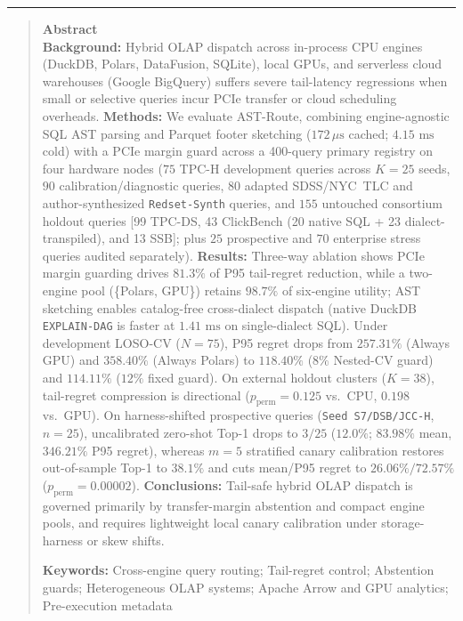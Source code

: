 \documentclass[10pt,a4paper]{article}
\begin{document}
\noindent\rule{\textwidth}{0.8pt}
\begin{quote}
\small\sffamily
\textbf{\color{springerblue}Abstract}\\[0.3em]
\textbf{Background:} Hybrid OLAP dispatch across in-process CPU engines (DuckDB, Polars, DataFusion, SQLite), local GPUs, and serverless cloud warehouses (Google BigQuery) suffers severe tail-latency regressions when small or selective queries incur PCIe transfer or cloud scheduling overheads.
\textbf{Methods:} We evaluate AST-Route, combining engine-agnostic SQL AST parsing and Parquet footer sketching ($172\,\mu\text{s}$ cached; $4.15\text{ ms}$ cold) with a PCIe margin guard across a 400-query primary registry on four hardware nodes ($75$ TPC-H development queries across $K=25$ seeds, $90$ calibration/diagnostic queries, $80$ adapted SDSS/NYC~TLC and author-synthesized \texttt{Redset-Synth} queries, and $155$ untouched consortium holdout queries [99 TPC-DS, 43 ClickBench (20 native SQL + 23 dialect-transpiled), and 13 SSB]; plus $25$ prospective and $70$ enterprise stress queries audited separately).
\textbf{Results:} Three-way ablation shows PCIe margin guarding drives $81.3\%$ of P95 tail-regret reduction, while a two-engine pool (\{Polars, GPU\}) retains $98.7\%$ of six-engine utility; AST sketching enables catalog-free cross-dialect dispatch (native DuckDB \texttt{EXPLAIN-DAG} is faster at $1.41\text{ ms}$ on single-dialect SQL). Under development LOSO-CV ($N=75$), P95 regret drops from $257.31\%$ (Always GPU) and $358.40\%$ (Always Polars) to $118.40\%$ ($8\%$ Nested-CV guard) and $114.11\%$ ($12\%$ fixed guard). On external holdout clusters ($K=38$), tail-regret compression is directional ($p_{\text{perm}}=0.125$ vs.\ CPU, $0.198$ vs.\ GPU). On harness-shifted prospective queries (\texttt{Seed S7/DSB/JCC-H}, $n=25$), uncalibrated zero-shot Top-1 drops to $3/25$ ($12.0\%$; $83.98\%$ mean, $346.21\%$ P95 regret), whereas $m=5$ stratified canary calibration restores out-of-sample Top-1 to $38.1\%$ and cuts mean/P95 regret to $26.06\%/72.57\%$ ($p_{\text{perm}}=0.00002$).
\textbf{Conclusions:} Tail-safe hybrid OLAP dispatch is governed primarily by transfer-margin abstention and compact engine pools, and requires lightweight local canary calibration under storage-harness or skew shifts.

\noindent\textbf{Keywords:} Cross-engine query routing; Tail-regret control; Abstention guards; Heterogeneous OLAP systems; Apache Arrow and GPU analytics; Pre-execution metadata
\end{quote}
\end{document}
